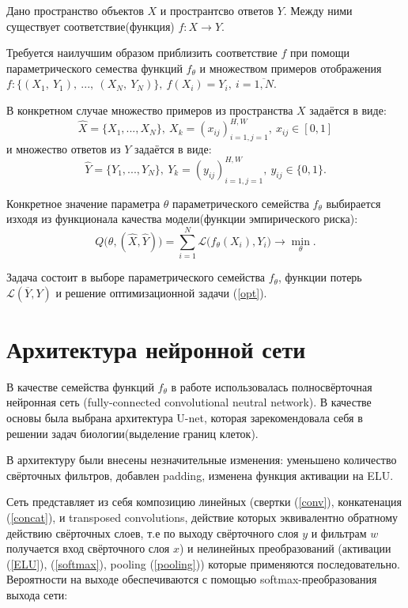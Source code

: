 \documentclass[14pt, a4paper, oneside, bold]{extarticle}
\begin{document}
Дано пространство объектов $X$ и пространтсво ответов $Y$. Между ними существует соответствие(функция) $f: X \rightarrow Y$. 

Требуется наилучшим образом приблизить соответствие $f$ при помощи 
параметрического семества функций $f_{\theta}$ и множеством примеров отображения $f: \{(X_1,\ Y_1),\ ... ,\ (X_N,\ Y_N) \}
	,\ f(X_i) = Y_i ,\ i = \overline{1, N}$.

В конкретном случае множество примеров из пространства $X$ задаётся в виде:
\begin{equation}
	\hat{X} = \{ X_1, ..., X_N \},\ X_k = (x_{ij})_{i=1, j=1}^{H, W}
                       	   ,\ x_{ij} \in [0, 1]
\end{equation}
и множество ответов из $Y$ задаётся в виде:
\begin{equation}
	\hat{Y} = \{ Y_1, ... , Y_N \},\ Y_k = (y_{ij})_{i=1, j=1}^{H, W}
							,\ y_{ij} \in \{ 0, 1 \}.
\end{equation} 

Конкретное значение параметра $\theta$ параметрического семейства $f_{\theta}$ выбирается изходя из функционала качества модели(функции эмпирического риска):
\begin{equation}\label{opt}
	Q \bigl( \theta, (\hat{X}, \hat{Y}) \bigr) = 
		\sum \limits_{i=1}^{N} \mathcal{L} 
		\bigl( f_{\theta}(X_i), Y_i \bigr)
		\longrightarrow \min \limits_{\theta}.
\end{equation}

Задача состоит в выборе параметрического семейства $f_\theta$, 
функции потерь $\mathcal{L}(\overline{Y}, Y)$ и решение 
оптимизационной задачи (\ref{opt}).

\newpage


\section{Архитектура нейронной сети}

В качестве семейства функций $f_{\theta}$ в работе использовалась 
полносвёрточная нейронная сеть (fully-connected convolutional neutral network). В качестве основы была выбрана архитектура U-net, которая зарекомендовала себя в решении задач биологии(выделение границ клеток). 

В архитектуру были внесены незначительные изменения: уменьшено количество свёрточных фильтров, добавлен padding, изменена функция активации на ELU.

Сеть представляет из себя композицию линейных
(свертки (\ref{conv}), конкатенация (\ref{concat}), и transposed convolutions, действие которых эквивалентно обратному действию свёрточных слоев, т.е по выходу свёрточного слоя $y$ и фильтрам $w$ получается вход свёрточного слоя $x$) 
и нелинейных преобразований
(активации (\ref{ELU}), (\ref{softmax}), pooling (\ref{pooling})) которые применяются последовательно. 
Вероятности на выходе обеспечиваются с помощью 
softmax-преобразования выхода сети: 
\end{document}
